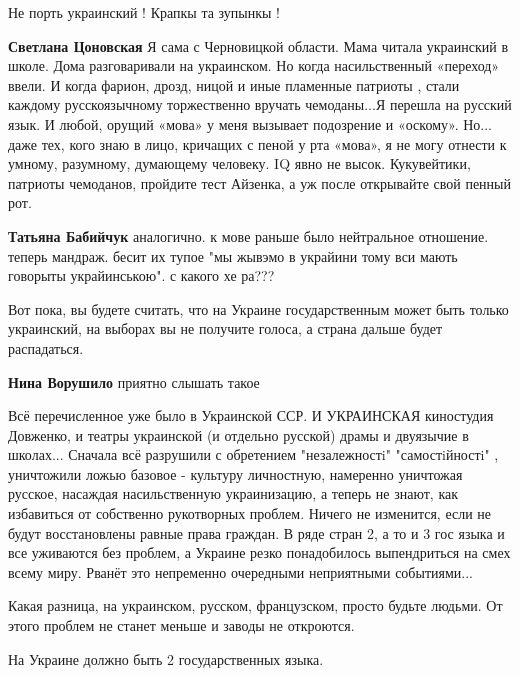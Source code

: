 \begin{itemize}
\begin{itemize} %
Не порть украинский ! Крапкы та зупынкы !

\textbf{Светлана Цоновская} Я сама с Черновицкой области. Мама читала
украинский в школе. Дома разговаривали на украинском. Но когда насильственный
«переход» ввели. И когда фарион, дрозд, ницой и иные пламенные патриоты , стали
каждому русскоязычному торжественно вручать чемоданы...Я перешла на русский
язык. И любой, орущий «мова» у меня вызывает подозрение и «оскому». Но... даже
тех, кого знаю в лицо, кричащих с пеной у рта «мова», я не могу отнести к
умному, разумному, думающему человеку. IQ явно не высок. Кукувейтики, патриоты
чемоданов, пройдите тест Айзенка, а уж после открывайте свой пенный рот.

\textbf{Татьяна Бабийчук} аналогично. к мове раньше было нейтральное отношение. теперь мандраж. бесит их тупое "мы жывэмо в украйини тому вси мають говорыты украйинською". с какого хе ра???
\end{itemize} %


Вот пока, вы будете считать, что на Украине государственным может быть только
украинский, на выборах вы не получите голоса, а страна дальше будет
распадаться.

\begin{itemize} %
\textbf{Нина Ворушило} приятно слышать такое
\end{itemize} %


Всё перечисленное уже было в Украинской ССР. И УКРАИНСКАЯ киностудия Довженко,
и театры украинской (и отдельно русской) драмы и двуязычие в школах... Сначала
всё разрушили с обретением "незалежностi" "самостiйностi" , уничтожили ложью
базовое - культуру личностную, намеренно уничтожая русское, насаждая
насильственную украинизацию, а теперь не знают, как избавиться от собственно
рукотворных проблем. Ничего не изменится, если не будут восстановлены равные
права граждан. В ряде стран 2, а то и 3 гос языка и все уживаются без проблем,
а Украине резко понадобилось выпендриться на смех всему миру. Рванёт это
непременно очередными неприятными событиями...

Какая разница, на украинском, русском, французском, просто будьте людьми. От этого проблем не станет меньше и заводы не откроются.

На Украине должно быть 2 государственных языка.


\end{itemize}
